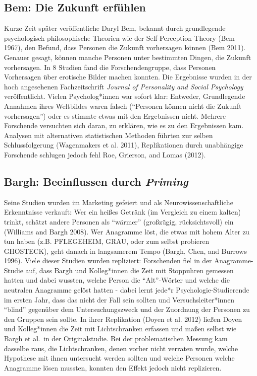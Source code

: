 \documentclass[
  letterpaper,
  DIV=11,
  numbers=noendperiod]{scrreprt}
\begin{document}
\subsection{Bem: Die Zukunft
erfühlen}\label{bem-die-zukunft-erfuxfchlen}

Kurze Zeit später veröffentliche Daryl Bem, bekannt durch grundlegende
psychologisch-philosophische Theorien wie der Self-Perception-Theory
(Bem 1967), den Befund, dass Personen die Zukunft vorhersagen können
(Bem 2011). Genauer gesagt, können manche Personen unter bestimmten
Dingen, die Zukunft vorhersagen. In 8 Studien fand die
Forschendengruppe, dass Personen Vorhersagen über erotische Bilder
machen konnten. Die Ergebnisse wurden in der hoch angesehenen
Fachzeitschrift \emph{Journal of Personality and Social Psychology}
veröffentlicht. Vielen Psycholog*innen war sofort klar: Entweder,
Grundlegende Annahmen ihres Weltbildes waren falsch (``Personen können
nicht die Zukunft vorhersagen'') oder es stimmte etwas mit den
Ergebnissen nicht. Mehrere Forschende versuchten sich daran, zu
erklären, wie es zu den Ergebnissen kam. Analysen mit alternativen
statistischen Methoden führten zur selben Schlussfolgerung (Wagenmakers
et al. 2011), Replikationen durch unabhängige Forschende schlugen jedoch
fehl Roe, Grierson, and Lomas (2012).

\subsection{\texorpdfstring{Bargh: Beeinflussen durch
\emph{Priming}}{Bargh: Beeinflussen durch Priming}}\label{bargh-beeinflussen-durch-priming}

Seine Studien wurden im Marketing gefeiert und als
Neurowissenschaftliche Erkenntnisse verkauft: Wer ein heißes Getränk (im
Vergleich zu einem kalten) trinkt, schätzt andere Personen als
``wärmer'' (großzügig, rücksichtsvoll) ein (Williams and Bargh 2008).
Wer Anagramme löst, die etwas mit hohem Alter zu tun haben (z.B.
PFLEGEHEIM, GRAU, oder zum selbst probieren GHOSTECK), geht danach in
langsamerem Tempo (Bargh, Chen, and Burrows 1996). Viele dieser Studien
wurden repliziert: Forschenden fiel in der Anagramme-Studie auf, dass
Bargh und Kolleg*innen die Zeit mit Stoppuhren gemessen hatten und dabei
wussten, welche Person die ``Alt''-Wörter und welche die neutralen
Anagramme gelöst hatten - dabei lernt jede*r Psychologie-Studierende im
ersten Jahr, dass das nicht der Fall sein sollten und
Versuchsleiter*innen ``blind'' gegenüber dem Untersuchungszweck und der
Zuordnung der Personen zu den Gruppen sein sollte. In ihrer Replikation
(Doyen et al. 2012) ließen Doyen und Kolleg*innen die Zeit mit
Lichtschranken erfassen und maßen selbst wie Bargh et al.~in der
Originalstudie. Bei der problematischen Messung kam dasselbe raus, die
Lichtschranken, denen vorher nicht verraten wurde, welche Hypothese mit
ihnen untersucht werden sollten und welche Personen welche Anagramme
lösen mussten, konnten den Effekt jedoch nicht replizieren.
\end{document}
